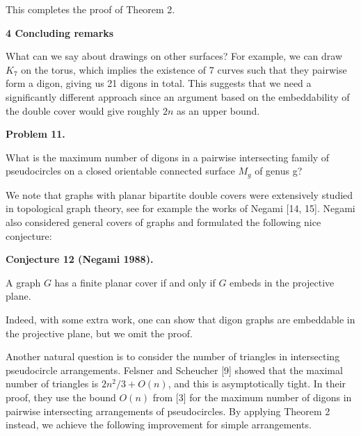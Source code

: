 \par
\par
This completes the proof of Theorem 2.
\par
\par
\par
\par
\par\medskip\noindent\textbf{4 Concluding remarks}\par
What can we say about drawings on other surfaces? For example, we can draw $K_{7}$ on the torus, which implies the existence of 7 curves such that they pairwise form a digon, giving us 21 digons in total. This suggests that we need a significantly different approach since an argument based on the embeddability of the double cover would give roughly $2n$ as an upper bound.
\par
\par
\par\medskip\noindent\textbf{Problem 11.}\par
What is the maximum number of digons in a pairwise intersecting family of pseudocircles on a closed orientable connected surface $M_{g}$ of genus g?
\par
\par
\par
We note that graphs with planar bipartite double covers were extensively studied in topological graph theory, see for example the works of Negami [14, 15]. Negami also considered general covers of graphs and formulated the following nice conjecture:
\par
\par
\par\medskip\noindent\textbf{Conjecture 12 (Negami 1988).}\par
A graph $G$ has a finite planar cover if and only if $G$ embeds in the projective plane.
\par
\par
\par
Indeed, with some extra work, one can show that digon graphs are embeddable in the projective plane, but we omit the proof.
\par
\par
Another natural question is to consider the number of triangles in intersecting pseudocircle arrangements. Felsner and Scheucher [9] showed that the maximal number of triangles is $2n^{2}/3+O(n)$, and this is asymptotically tight. In their proof, they use the bound $O(n)$ from [3] for the maximum number of digons in pairwise intersecting arrangements of pseudocircles. By applying Theorem 2 instead, we achieve the following improvement for simple arrangements.

